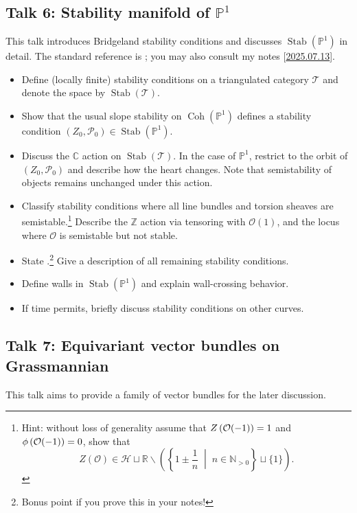 \documentclass[UTF8]{amsart}
\numberwithin{equation}{section}
\theoremstyle{plain}
\numberwithin{equation}{section}
\theoremstyle{remark}
\DeclareMathOperator{\Coh}{\operatorname{Coh}}
\DeclareMathOperator{\Stab}{\operatorname{Stab}}
\begin{document}
\subsection*{Talk 6: Stability manifold of $\mathbb{P}^1$}
This talk introduces Bridgeland stability conditions and discusses $\Stab(\mathbb{P}^1)$ in detail. The standard reference is \cite{Okada05,GKR03}; you may also consult my notes [\href{https://github.com/ramified/personal_handwritten_collection/raw/main/weeklyupdate/2025/2025.07.13_stability_manifold_of_P\%5E1.pdf}{2025.07.13}].

\begin{itemize}
\item Define (locally finite) stability conditions on a triangulated category $\mathcal{T}$ and denote the space by $\Stab(\mathcal{T})$.
\item Show that the usual slope stability on $\Coh(\mathbb{P}^1)$ defines a stability condition $(Z_0, \mathcal{P}_0) \in \Stab(\mathbb{P}^1)$.
\item Discuss the $\mathbb{C}$ action on $\Stab(\mathcal{T})$. In the case of $\mathbb{P}^1$, restrict to the orbit of $(Z_0, \mathcal{P}_0)$ and describe how the heart changes. Note that semistability of objects remains unchanged under this action.
\item Classify stability conditions where all line bundles and torsion sheaves are semistable.\footnote{Hint: without loss of generality assume that $Z\left(\rule{0mm}{2.3mm}\mathcal{O}(-1)\right)=1$ and $\phi\left(\rule{0mm}{2.3mm}\mathcal{O}(-1)\right)=0$, show that
$$Z(\mathcal{O}) \in \mathcal{H} \sqcup \mathbb{R} \smallsetminus \left( \left\{ 1 \pm \frac{1}{n} \;\middle|\; n \in \mathbb{N}_{>0} \right\} \sqcup \{1\} \right).$$
} Describe the $\mathbb{Z}$ action via tensoring with $\mathcal{O}(1)$, and the locus where $\mathcal{O}$ is semistable but not stable.
\item State \cite[Lemma 3.1(d)]{Okada05}.\footnote{Bonus point if you prove this in your notes!} Give a description of all remaining stability conditions.
\item Define walls in $\Stab(\mathbb{P}^1)$ and explain wall-crossing behavior.
\item If time permits, briefly discuss stability conditions on other curves.
\end{itemize}

\subsection*{Talk 7: Equivariant vector bundles on Grassmannian}
This talk aims to provide a family of vector bundles for the later discussion.
\end{document}

